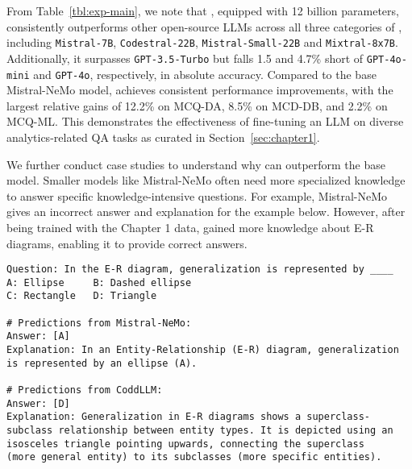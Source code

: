  From Table~\ref{tbl:exp-main}, we note that \modelname, equipped with 12 billion parameters, consistently outperforms other open-source LLMs across all three categories of \mmlu, including \texttt{Mistral-7B}, \texttt{Codestral-22B}, \texttt{Mistral-Small-22B} and \texttt{Mixtral-8x7B}. Additionally, it surpasses \texttt{GPT-3.5-Turbo} but falls 1.5 and 4.7\% short of \texttt{GPT-4o-mini} and \texttt{GPT-4o}, respectively, in absolute accuracy. Compared to the base Mistral-NeMo model, \modelname achieves consistent performance improvements, with the largest relative gains of 12.2\% on MCQ-DA, 8.5\% on MCD-DB, and 2.2\% on MCQ-ML. This demonstrates the effectiveness of fine-tuning an LLM on diverse analytics-related QA tasks as curated in Section~\ref{sec:chapter1}.


We further conduct case studies to understand why \modelname can outperform the base model. Smaller models like Mistral-NeMo often need more specialized knowledge to answer specific knowledge-intensive questions. For example, Mistral-NeMo gives an incorrect answer and explanation for the example below. However, after being trained with the Chapter 1 data, \modelname gained more knowledge about E-R diagrams, enabling it to provide correct answers.


\begin{tcolorbox}[left=1pt, right=0pt, top=1pt, bottom=1pt]
\begin{verbatim}
Question: In the E-R diagram, generalization is represented by ____
A: Ellipse     B: Dashed ellipse
C: Rectangle   D: Triangle

# Predictions from Mistral-NeMo:
Answer: [A] 
Explanation: In an Entity-Relationship (E-R) diagram, generalization 
is represented by an ellipse (A). 

# Predictions from CoddLLM: 
Answer: [D]
Explanation: Generalization in E-R diagrams shows a superclass-
subclass relationship between entity types. It is depicted using an 
isosceles triangle pointing upwards, connecting the superclass 
(more general entity) to its subclasses (more specific entities).
\end{verbatim}
\end{tcolorbox}
